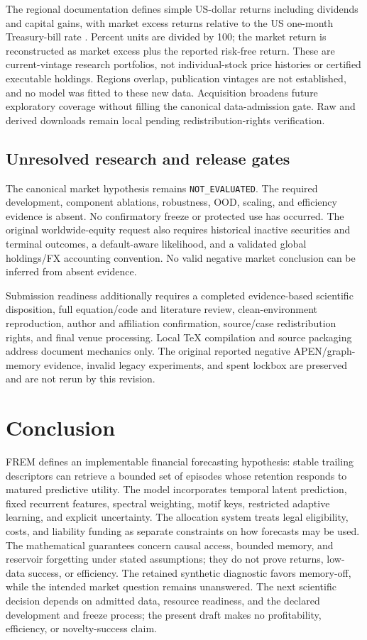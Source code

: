 \documentclass[11pt,a4paper]{article}
\begin{document}
The regional documentation defines simple US-dollar returns including dividends and capital gains, with market excess returns relative to the US one-month Treasury-bill rate \citep{frenchlibrary}. Percent units are divided by 100; the market return is reconstructed as market excess plus the reported risk-free return. These are current-vintage research portfolios, not individual-stock price histories or certified executable holdings. Regions overlap, publication vintages are not established, and no model was fitted to these new data. Acquisition broadens future exploratory coverage without filling the canonical data-admission gate. Raw and derived downloads remain local pending redistribution-rights verification.

\subsection{Unresolved research and release gates}
The canonical market hypothesis remains \texttt{NOT\_EVALUATED}. The required development, component ablations, robustness, OOD, scaling, and efficiency evidence is absent. No confirmatory freeze or protected use has occurred. The original worldwide-equity request also requires historical inactive securities and terminal outcomes, a default-aware likelihood, and a validated global holdings/FX accounting convention. No valid negative market conclusion can be inferred from absent evidence.

Submission readiness additionally requires a completed evidence-based scientific disposition, full equation/code and literature review, clean-environment reproduction, author and affiliation confirmation, source/case redistribution rights, and final venue processing. Local TeX compilation and source packaging address document mechanics only. The original reported negative APEN/graph-memory evidence, invalid legacy experiments, and spent lockbox are preserved and are not rerun by this revision.

\section{Conclusion}

FREM defines an implementable financial forecasting hypothesis: stable trailing descriptors can retrieve a bounded set of episodes whose retention responds to matured predictive utility. The model incorporates temporal latent prediction, fixed recurrent features, spectral weighting, motif keys, restricted adaptive learning, and explicit uncertainty. The allocation system treats legal eligibility, costs, and liability funding as separate constraints on how forecasts may be used. The mathematical guarantees concern causal access, bounded memory, and reservoir forgetting under stated assumptions; they do not prove returns, low-data success, or efficiency. The retained synthetic diagnostic favors memory-off, while the intended market question remains unanswered. The next scientific decision depends on admitted data, resource readiness, and the declared development and freeze process; the present draft makes no profitability, efficiency, or novelty-success claim.
\end{document}
